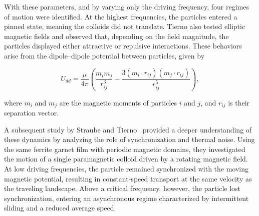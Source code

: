 With these parameters, and by varying only the driving frequency, four regimes of motion were identified. At the highest frequencies, the particles entered a pinned state, meaning the colloids did not translate. Tierno also tested elliptic magnetic fields and observed that, depending on the field magnitude, the particles displayed either attractive or repulsive interactions. These behaviors arise from the dipole–dipole potential between particles, given by

\begin{equation}
U_{dd} = \frac{\mu}{4\pi} \left( \frac{m_i m_j}{r^3_{ij}} - \frac{3(m_i \cdot r_{ij})(m_j \cdot r_{ij})}{r^5_{ij}} \right),
\label{eq:dipolepairpotential}
\end{equation}

where $m_i$ and $m_j$ are the magnetic moments of particles $i$ and $j$, and $r_{ij}$ is their separation vector.

A subsequent study by Straube and Tierno~\cite{straube2013synchronous} provided a deeper understanding of these dynamics by analyzing the role of synchronization and thermal noise. Using the same ferrite garnet film with periodic magnetic domains, they investigated the motion of a single paramagnetic colloid driven by a rotating magnetic field. At low driving frequencies, the particle remained synchronized with the moving magnetic potential, resulting in constant-speed transport at the same velocity as the traveling landscape. Above a critical frequency, however, the particle lost synchronization, entering an asynchronous regime characterized by intermittent sliding and a reduced average speed.

